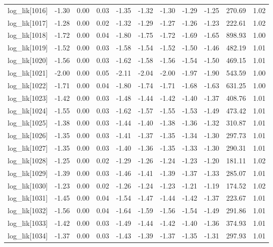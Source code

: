 \begin{table}[ht]
\begin{tabular}{rrrrrrrrrrr}
  log\_lik[1016] & -1.30 & 0.00 & 0.03 & -1.35 & -1.32 & -1.30 & -1.29 & -1.25 & 270.69 & 1.02 \\ 
  log\_lik[1017] & -1.28 & 0.00 & 0.02 & -1.32 & -1.29 & -1.27 & -1.26 & -1.23 & 222.61 & 1.02 \\ 
  log\_lik[1018] & -1.72 & 0.00 & 0.04 & -1.80 & -1.75 & -1.72 & -1.69 & -1.65 & 898.93 & 1.00 \\ 
  log\_lik[1019] & -1.52 & 0.00 & 0.03 & -1.58 & -1.54 & -1.52 & -1.50 & -1.46 & 482.19 & 1.01 \\ 
  log\_lik[1020] & -1.56 & 0.00 & 0.03 & -1.62 & -1.58 & -1.56 & -1.54 & -1.50 & 469.15 & 1.01 \\ 
  log\_lik[1021] & -2.00 & 0.00 & 0.05 & -2.11 & -2.04 & -2.00 & -1.97 & -1.90 & 543.59 & 1.00 \\ 
  log\_lik[1022] & -1.71 & 0.00 & 0.04 & -1.80 & -1.74 & -1.71 & -1.68 & -1.63 & 631.25 & 1.00 \\ 
  log\_lik[1023] & -1.42 & 0.00 & 0.03 & -1.48 & -1.44 & -1.42 & -1.40 & -1.37 & 408.76 & 1.01 \\ 
  log\_lik[1024] & -1.55 & 0.00 & 0.03 & -1.62 & -1.57 & -1.55 & -1.53 & -1.49 & 473.42 & 1.01 \\ 
  log\_lik[1025] & -1.38 & 0.00 & 0.03 & -1.44 & -1.40 & -1.38 & -1.36 & -1.32 & 310.87 & 1.01 \\ 
  log\_lik[1026] & -1.35 & 0.00 & 0.03 & -1.41 & -1.37 & -1.35 & -1.34 & -1.30 & 297.73 & 1.01 \\ 
  log\_lik[1027] & -1.35 & 0.00 & 0.03 & -1.40 & -1.36 & -1.35 & -1.33 & -1.30 & 290.31 & 1.01 \\ 
  log\_lik[1028] & -1.25 & 0.00 & 0.02 & -1.29 & -1.26 & -1.24 & -1.23 & -1.20 & 181.11 & 1.02 \\ 
  log\_lik[1029] & -1.39 & 0.00 & 0.03 & -1.46 & -1.41 & -1.39 & -1.37 & -1.33 & 285.07 & 1.01 \\ 
  log\_lik[1030] & -1.23 & 0.00 & 0.02 & -1.26 & -1.24 & -1.23 & -1.21 & -1.19 & 174.52 & 1.02 \\ 
  log\_lik[1031] & -1.45 & 0.00 & 0.04 & -1.54 & -1.47 & -1.44 & -1.42 & -1.37 & 223.67 & 1.01 \\ 
  log\_lik[1032] & -1.56 & 0.00 & 0.04 & -1.64 & -1.59 & -1.56 & -1.54 & -1.49 & 291.86 & 1.01 \\ 
  log\_lik[1033] & -1.42 & 0.00 & 0.03 & -1.49 & -1.44 & -1.42 & -1.40 & -1.36 & 374.93 & 1.01 \\ 
  log\_lik[1034] & -1.37 & 0.00 & 0.03 & -1.43 & -1.39 & -1.37 & -1.35 & -1.31 & 297.93 & 1.01 \\ 

\end{tabular}
\end{table}
